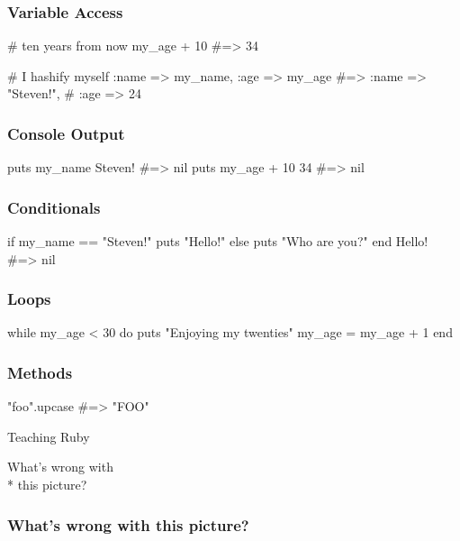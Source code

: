 \documentclass[20pt]{beamer}
\begin{document}
\begin{frame}[fragile]
\frametitle{Variable Access}
\begin{rubycode}
# ten years from now
my_age + 10 #=> 34

# I hashify myself
{ :name => my_name,
  :age => my_age }
#=> {:name => "Steven!",
#    :age => 24}
\end{rubycode}
\end{frame}

\begin{frame}[fragile]
\frametitle{Console Output}
\begin{rubycode}
puts my_name
Steven!
#=> nil
puts my_age + 10
34
#=> nil
\end{rubycode}
\end{frame}

\begin{frame}[fragile]
\frametitle{Conditionals}
\begin{rubycode}
if my_name == "Steven!"
  puts "Hello!"
else
  puts "Who are you?"
end
Hello!
#=> nil
\end{rubycode}
\end{frame}

\begin{frame}[fragile]
\frametitle{Loops}
\begin{rubycode}
while my_age < 30 do
  puts "Enjoying my twenties"
  my_age = my_age + 1
end
\end{rubycode}
\end{frame}

\begin{frame}[fragile]
\frametitle{Methods}
\begin{rubycode}
"foo".upcase #=> "FOO"
\end{rubycode}
\end{frame}

{
\begin{frame}
\par { Teaching Ruby}\par
\vspace{3cm}\hfill
{What's wrong with\\* \hfill this picture?}
\end{frame}
}

\begin{frame}
\frametitle{What's wrong with this picture?}
{
}
\end{frame}
\end{document}
